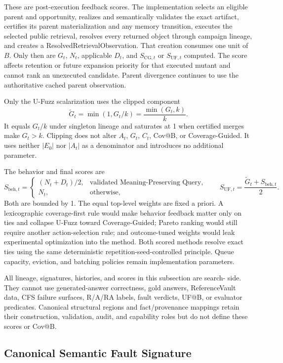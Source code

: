 These are post-execution feedback scores. The implementation selects an
eligible parent and opportunity, realizes and semantically validates the exact
artifact, certifies its parent materialization and any memory transition,
executes the selected public retrieval, resolves every returned object through
campaign lineage, and creates a ResolvedRetrievalObservation. That creation
consumes one unit of \(B\). Only then are \(G_t\), \(N_t\), applicable \(D_t\),
and \(S_{\mathrm{CG},t}\) or \(S_{\mathrm{UF},t}\) computed. The score affects
retention or future expansion priority for that executed mutant and cannot
rank an unexecuted candidate. Parent divergence continues to use the
authoritative cached parent observation.

Only the U-Fuzz scalarization uses the clipped component
\[
\widetilde{G}_t=\min(1,G_t/k)=\frac{\min(G_t,k)}{k}.
\]
It equals \(G_t/k\) under singleton lineage and saturates at 1 when certified
merges make \(G_t>k\). Clipping does not alter \(A_t\), \(G_t\), \(C_t\),
Cov@B, or Coverage-Guided. It uses neither \(|E_0|\) nor \(|A_t|\) as a
denominator and introduces no additional parameter.

The behavior and final scores are
\[
S_{\mathrm{beh},t}=
\begin{cases}
(N_t+D_t)/2,&\text{validated Meaning-Preserving Query},\\
N_t,&\text{otherwise},
\end{cases}
\qquad
S_{\mathrm{UF},t}=\frac{\widetilde{G}_t+S_{\mathrm{beh},t}}{2}.
\]
Both are bounded by 1. The equal top-level weights are fixed a priori. A
lexicographic coverage-first rule would make behavior feedback matter only on
ties and collapse U-Fuzz toward Coverage-Guided; Pareto ranking would still
require another action-selection rule; and outcome-tuned weights would leak
experimental optimization into the method. Both scored methods resolve exact
ties using the same deterministic repetition-seed-controlled principle. Queue
capacity, eviction, and batching policies remain implementation parameters.

All lineage, signatures, histories, and scores in this subsection are search-
side. They cannot use generated-answer correctness, gold answers,
ReferenceVault data, CFS failure surfaces, R/A/RA labels, fault verdicts, UF@B,
or evaluator predicates. Canonical structural regions and fact/provenance
mappings retain their construction, validation, audit, and capability roles
but do not define these scores or Cov@B.

\subsection{Canonical Semantic Fault Signature}
\label{app:fault-signature}

